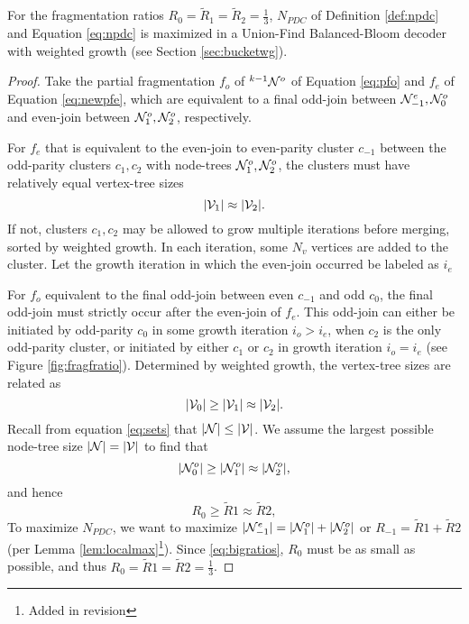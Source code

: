 \begin{theorem}\label{the:fragratio}
  For the fragmentation ratios $R_0 = \tilde{R}_1 = \tilde{R}_2 = \frac{1}{3}$, $N_{PDC}$ of Definition \ref{def:npdc} and Equation \eqref{eq:npdc} is maximized in a Union-Find Balanced-Bloom decoder with weighted growth (see Section \ref{sec:bucketwg}).
\end{theorem}
\begin{proof}
  Take the partial fragmentation $f_o$ of ${}^{k-1}\mathcal{N}^o$ of Equation \eqref{eq:pfo} and $f_e$ of Equation \eqref{eq:newpfe}, which are equivalent to a final odd-join between $\mathcal{N}^e_{-1}, \mathcal{N}^o_0$ and even-join between $\mathcal{N}^o_1, \mathcal{N}^o_2$, respectively.

  For $f_e$ that is equivalent to the even-join to even-parity cluster $c_{-1}$ between the odd-parity clusters $c_1, c_2$ with node-trees $\mathcal{N}^o_1, \mathcal{N}^o_2$, the clusters must have relatively equal vertex-tree sizes
  \begin{equation*}
    \lvert\mathcal{V}_1\rvert \approx \lvert\mathcal{V}_2\rvert.
  \end{equation*}
  If not, clusters $c_1, c_2$ may be allowed to grow multiple iterations before merging, sorted by weighted growth. In each iteration, some $N_v$ vertices are added to the cluster. Let the growth iteration in which the even-join occurred be labeled as $i_e$

  For $f_o$ equivalent to the final odd-join between even $c_{-1}$ and odd $c_0$, the final odd-join must strictly occur after the even-join of $f_e$. This odd-join can either be initiated by odd-parity $c_0$ in some growth iteration $i_o > i_e$, when $c_2$ is the only odd-parity cluster, or initiated by either $c_1$ or $c_2$ in growth iteration $i_o = i_e$ (see Figure \ref{fig:fragfratio}). Determined by weighted growth, the vertex-tree sizes are related as
  \begin{equation*}
    \lvert\mathcal{V}_0\rvert \geq \lvert\mathcal{V}_1\rvert \approx \lvert\mathcal{V}_2\rvert.
  \end{equation*}
  Recall from equation \eqref{eq:sets} that $|\mathcal{N}| \leq |\mathcal{V}|$. We assume the largest possible node-tree size $|\mathcal{N}| = |\mathcal{V}|$ to find that
  \begin{equation*}
    \lvert\mathcal{N}^o_0\rvert \geq \lvert\mathcal{N}^o_1\rvert \approx \lvert\mathcal{N}^o_2\rvert,
  \end{equation*}
  and hence
  \begin{equation*}
    R_0 \geq \tilde{R}1 \approx \tilde{R}2,
  \end{equation*}
  To maximize $N_{PDC}$, we want to maximize $\lvert\mathcal{N}^e_{-1}\rvert = \lvert\mathcal{N}^o_1\rvert + \lvert\mathcal{N}^o_2\rvert$ or $R_{-1}=\tilde{R}1 + \tilde{R}2$ (per Lemma \ref{lem:localmax}\footnote{Added in revision}). Since \eqref{eq:bigratios}, $R_0$ must be as small as possible, and thus $R_0 = \tilde{R}1 = \tilde{R}2 = \frac{1}{3}$.
\end{proof}

